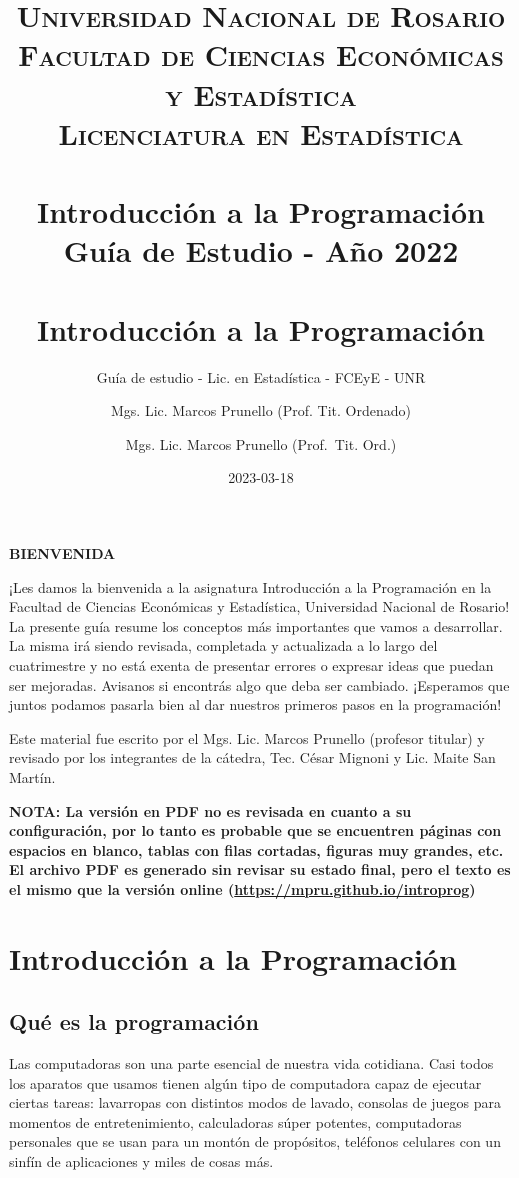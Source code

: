 \documentclass[
]{book}
\title{
	\usefont{OT1}{bch}{b}{n}
	\normalfont \normalsize
	\textsc{
		Universidad Nacional de Rosario \\
		Facultad de Ciencias Económicas y Estadística \\
		Licenciatura en Estadística
	} \\ [25pt]
	\horrule{2pt} \\[0.4cm]
	\huge \textbf{Introducción a la Programación} \\
	\bigbreak
	Guía de Estudio - Año 2022\\
	\horrule{2pt} \\[0.5cm]}
\author{
	\normalfont Mgs. Lic. Marcos Prunello (Prof. Tit. Ordenado)
}
\title{Introducción a la Programación}
\subtitle{Guía de estudio - Lic. en Estadística - FCEyE - UNR}
\author{Mgs. Lic. Marcos Prunello (Prof.~Tit. Ord.)}
\date{2023-03-18}
\begin{document}
\maketitle

{
\setcounter{tocdepth}{1}
\tableofcontents
}
\newpage

\textbf{BIENVENIDA}

\vspace{\baselineskip}

¡Les damos la bienvenida a la asignatura Introducción a la Programación en la Facultad de Ciencias Económicas y Estadística, Universidad Nacional de Rosario! La presente guía resume los conceptos más importantes que vamos a desarrollar. La misma irá siendo revisada, completada y actualizada a lo largo del cuatrimestre y no está exenta de presentar errores o expresar ideas que puedan ser mejoradas. Avisanos si encontrás algo que deba ser cambiado. ¡Esperamos que juntos podamos pasarla bien al dar nuestros primeros pasos en la programación!

\vspace{\baselineskip}

Este material fue escrito por el Mgs. Lic. Marcos Prunello (profesor titular) y revisado por los integrantes de la cátedra, Tec. César Mignoni y Lic. Maite San Martín.

\vspace{\baselineskip}

\textbf{NOTA: La versión en PDF no es revisada en cuanto a su configuración, por lo tanto es probable que se encuentren páginas con espacios en blanco, tablas con filas cortadas, figuras muy grandes, etc. El archivo PDF es generado sin revisar su estado final, pero el texto es el mismo que la versión online (\url{https://mpru.github.io/introprog})}

\hypertarget{introducciuxf3n-a-la-programaciuxf3n}{%
\chapter{Introducción a la Programación}\label{introducciuxf3n-a-la-programaciuxf3n}}

\hypertarget{quuxe9-es-la-programaciuxf3n}{%
\section{Qué es la programación}\label{quuxe9-es-la-programaciuxf3n}}

Las computadoras son una parte esencial de nuestra vida cotidiana. Casi todos los aparatos que usamos tienen algún tipo de computadora capaz de ejecutar ciertas tareas: lavarropas con distintos modos de lavado, consolas de juegos para momentos de entretenimiento, calculadoras súper potentes, computadoras personales que se usan para un montón de propósitos, teléfonos celulares con un sinfín de aplicaciones y miles de cosas más.
\end{document}
